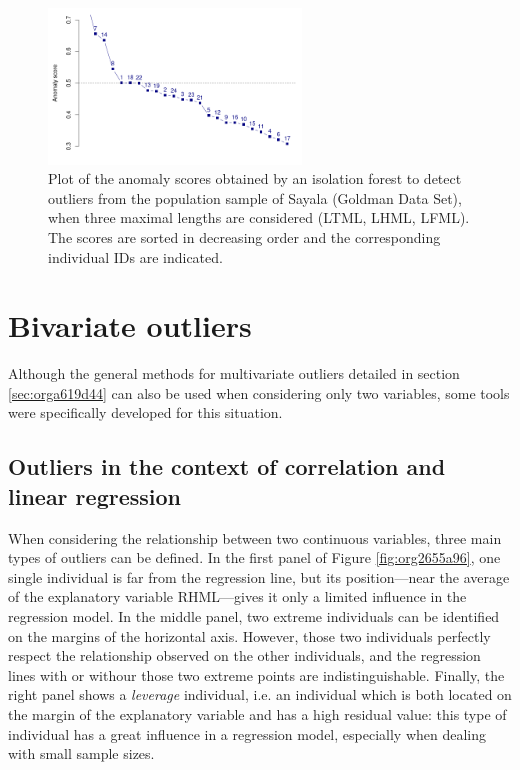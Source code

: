 \documentclass[review, 3p]{elsarticle}
\begin{document}
\begin{figure}[htbp]
\centering
\includegraphics[width=0.6\textwidth]{figures/anomaly_plot.png}
\caption{\label{fig:org5505cf5}Plot of the anomaly scores obtained by an isolation forest to detect outliers from the population sample of Sayala (Goldman Data Set), when three maximal lengths are considered (LTML, LHML, LFML). The scores are sorted in decreasing order and the corresponding individual IDs are indicated.}
\end{figure}

\section{Bivariate outliers}
\label{sec:org96f6bee}
Although the general methods for multivariate outliers detailed in section \ref{sec:orga619d44} can also be used when considering only two variables, some tools were specifically developed for this situation.

\subsection{Outliers in the context of correlation and linear regression}
\label{sec:org82f27cd}
When considering the relationship between two continuous variables, three main types of outliers can be defined. In the first panel of Figure \ref{fig:org2655a96}, one single individual is far from the regression line, but its position---near the average of the explanatory variable RHML---gives it only a limited influence in the regression model. In the middle panel, two extreme individuals can be identified on the margins of the horizontal axis. However, those two individuals perfectly respect the relationship observed on the other individuals, and the regression lines with or withour those two extreme points are indistinguishable. Finally, the right panel shows a \emph{leverage} individual, i.e. an individual which is both located on the margin of the explanatory variable and has a high residual value: this type of individual has a great influence in a regression model, especially when dealing with small sample sizes.
\end{document}
